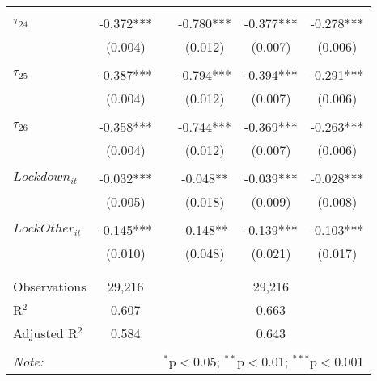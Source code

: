 \begin{tabular}{@{\extracolsep{-5pt}}lccccc}
                &           &&           &           &           \\[-2.1ex]
$\tau_{24}$     & -0.372*** && -0.780*** & -0.377*** & -0.278*** \\
                &  (0.004)  &&  (0.012)  &  (0.007)  &  (0.006)  \\
                &           &&           &           &           \\[-2.1ex]
$\tau_{25}$     & -0.387*** && -0.794*** & -0.394*** & -0.291*** \\
                &  (0.004)  &&  (0.012)  &  (0.007)  &  (0.006)  \\
                &           &&           &           &           \\[-2.1ex]
$\tau_{26}$     & -0.358*** && -0.744*** & -0.369*** & -0.263*** \\
                &  (0.004)  &&  (0.012)  &  (0.007)  &  (0.006)  \\
                &           &&           &           &           \\[-1.ex]
$Lockdown_{it}$ & -0.032*** &&  -0.048** & -0.039*** & -0.028*** \\
                &  (0.005)  &&  (0.018)  &  (0.009)  &  (0.008)  \\
                &           &&           &           &           \\[-2.1ex]
$LockOther_{it}$& -0.145*** &&  -0.148** & -0.139*** & -0.103*** \\
                &  (0.010)  &&  (0.048)  &  (0.021)  &  (0.017)  \\
                &           &&           &           &           \\[-2.1ex]

\hline \\[-1.8ex] 
Observations     & 29,216 && \multicolumn{3}{c}{29,216} \\ 
R$^{2}$          &  0.607 && \multicolumn{3}{c}{0.663 } \\ 
Adjusted R$^{2}$ &  0.584 && \multicolumn{3}{c}{0.643 } \\ 
\hline 
\hline \\[-1.8ex] 
\textit{Note:}  & \multicolumn{5}{r}{$^{*}$p$<$0.05; $^{**}$p$<$0.01; $^{***}$p$<$0.001} \\ 
\end{tabular} 
